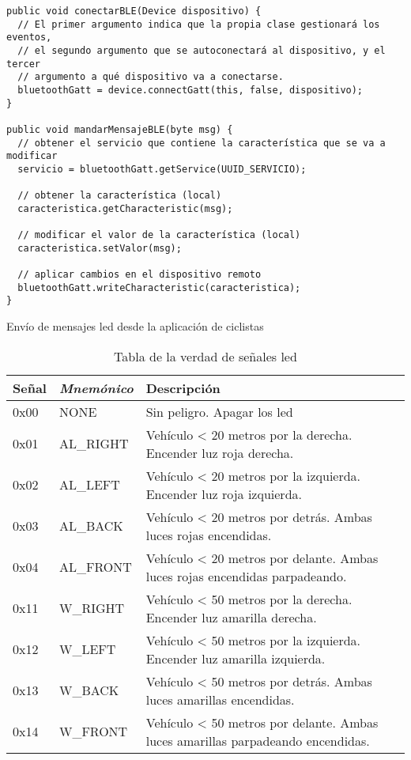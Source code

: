 \begin{description}
		\begin{listing}
			\begin{minipage}{.4\textwidth}
				\begin{verbatim}
public void conectarBLE(Device dispositivo) {
  // El primer argumento indica que la propia clase gestionará los eventos,
  // el segundo argumento que se autoconectará al dispositivo, y el tercer
  // argumento a qué dispositivo va a conectarse.
  bluetoothGatt = device.connectGatt(this, false, dispositivo);
}

public void mandarMensajeBLE(byte msg) {
  // obtener el servicio que contiene la característica que se va a modificar
  servicio = bluetoothGatt.getService(UUID_SERVICIO);

  // obtener la característica (local)
  caracteristica.getCharacteristic(msg);

  // modificar el valor de la característica (local)
  caracteristica.setValor(msg);

  // aplicar cambios en el dispositivo remoto
  bluetoothGatt.writeCharacteristic(caracteristica);
}
				\end{verbatim}
			\end{minipage}
		\caption{Envío de mensajes led desde la aplicación de ciclistas}\label{alg:appciclistasBLE}
	\end{listing}
\end{description}

\begin{table}[H]
	\centering
	\caption{Tabla de la verdad de señales led}\label{tab:tablaVerdadLED}
	\begin{tabular}{lll}
		\toprule
		\textbf{Señal} & \emph{Mnemónico} & Descripción \\
		\midrule
		0x00 & NONE    & Sin peligro. Apagar los led \\
		0x01 & AL\_RIGHT & Vehículo < 20 metros por la derecha. Encender luz
		roja derecha. \\
		0x02 & AL\_LEFT & Vehículo < 20 metros por la izquierda. Encender luz
		roja izquierda. \\
		0x03 & AL\_BACK & Vehículo < 20 metros por detrás. Ambas luces rojas
		encendidas. \\
		0x04 & AL\_FRONT & Vehículo < 20 metros por delante. Ambas luces rojas
		encendidas parpadeando. \\
		0x11 & W\_RIGHT & Vehículo < 50 metros por la derecha. Encender luz
		amarilla derecha. \\
		0x12 & W\_LEFT & Vehículo < 50 metros por la izquierda. Encender luz
		amarilla izquierda. \\
		0x13 & W\_BACK & Vehículo < 50 metros por detrás. Ambas luces amarillas
		encendidas. \\
		0x14 & W\_FRONT & Vehículo < 50 metros por delante. Ambas luces amarillas
		parpadeando encendidas.\\
		\bottomrule
	\end{tabular}
\end{table}
